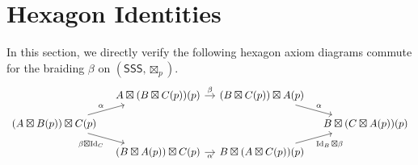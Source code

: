 \documentclass[11pt,reqno]{amsart}
\DeclareMathOperator{\Id}{Id}
\newcommand{\SSS}{\mathsf{SSS}}
\numberwithin{equation}{section}
\theoremstyle{plain}
\theoremstyle{definition}
\begin{document}
\section{Hexagon Identities}\label{app:hexagon-identities}
In this section, we directly verify the following hexagon axiom diagrams commute for the braiding $\beta$ on $(\SSS,\boxtimes_p)$.
\begin{equation}\label{braidhex1}
    \begin{tikzcd}[column sep=1em, row sep=1em]
        & A \boxtimes (B \boxtimes C(p))(p) \arrow[r, "\beta"] & (B \boxtimes C(p)) \boxtimes A(p) \arrow[dr, "\alpha"] & \\
        (A \boxtimes B(p)) \boxtimes C(p) \arrow[ur, "\alpha"] \arrow[dr, "\beta \boxtimes \Id_C"'] & & & B \boxtimes (C \boxtimes A(p))(p) \\
        & (B \boxtimes A(p)) \boxtimes C(p) \arrow[r, "\alpha"']& B \boxtimes (A \boxtimes C(p))(p) \arrow[ur, "\Id_B \boxtimes \beta"'] &
    \end{tikzcd}
\end{equation}
\end{document}
